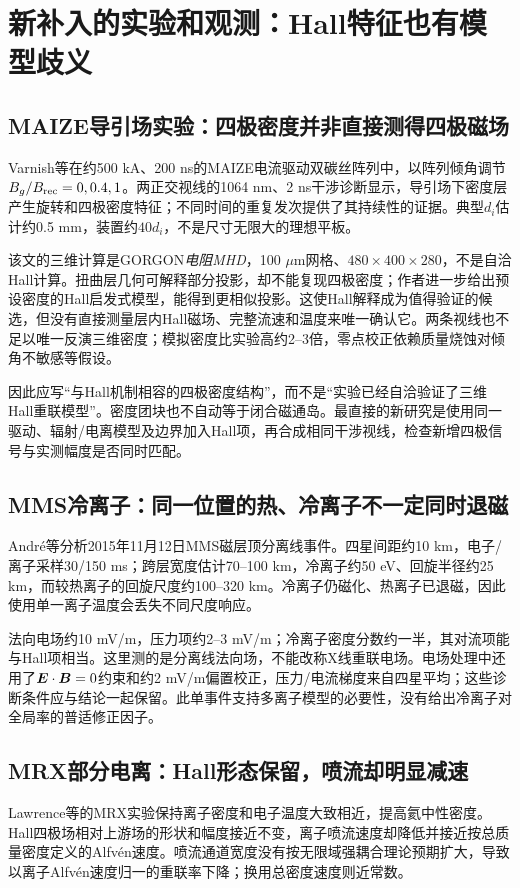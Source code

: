 \section{新补入的实验和观测：Hall特征也有模型歧义}
\subsection{MAIZE导引场实验：四极密度并非直接测得四极磁场}
Varnish等\citep{F703}在约500 kA、200 ns的MAIZE电流驱动双碳丝阵列中，以阵列倾角调节$B_g/B_{\rm rec}=0,0.4,1$。两正交视线的1064 nm、2 ns干涉诊断显示，导引场下密度层产生旋转和四极密度特征；不同时间的重复发次提供了其持续性的证据。典型$d_i$估计约0.5 mm，装置约$40d_i$，不是尺寸无限大的理想平板。

该文的三维计算是GORGON\emph{电阻MHD}，100 $\mu$m网格、$480\times400\times280$，不是自洽Hall计算。扭曲层几何可解释部分投影，却不能复现四极密度；作者进一步给出预设密度的Hall启发式模型，能得到更相似投影。这使Hall解释成为值得验证的候选，但没有直接测量层内Hall磁场、完整流速和温度来唯一确认它。两条视线也不足以唯一反演三维密度；模拟密度比实验高约2--3倍，零点校正依赖质量烧蚀对倾角不敏感等假设。

因此应写“与Hall机制相容的四极密度结构”，而不是“实验已经自洽验证了三维Hall重联模型”。密度团块也不自动等于闭合磁通岛。最直接的新研究是使用同一驱动、辐射/电离模型及边界加入Hall项，再合成相同干涉视线，检查新增四极信号与实测幅度是否同时匹配。

\subsection{MMS冷离子：同一位置的热、冷离子不一定同时退磁}
André等\citep{L227}分析2015年11月12日MMS磁层顶分离线事件。四星间距约10 km，电子/离子采样30/150 ms；跨层宽度估计70--100 km，冷离子约50 eV、回旋半径约25 km，而较热离子的回旋尺度约100--320 km。冷离子仍磁化、热离子已退磁，因此使用单一离子温度会丢失不同尺度响应。

法向电场约10 mV/m，压力项约2--3 mV/m；冷离子密度分数约一半，其对流项能与Hall项相当。这里测的是分离线法向场，不能改称X线重联电场。电场处理中还用了$\bm{E}\cdot\bm{B}=0$约束和约2 mV/m偏置校正，压力/电流梯度来自四星平均；这些诊断条件应与结论一起保留。此单事件支持多离子模型的必要性，没有给出冷离子对全局率的普适修正因子。

\subsection{MRX部分电离：Hall形态保留，喷流却明显减速}
Lawrence等的MRX实验\citep{L190}保持离子密度和电子温度大致相近，提高氦中性密度。Hall四极场相对上游场的形状和幅度接近不变，离子喷流速度却降低并接近按总质量密度定义的Alfvén速度。喷流通道宽度没有按无限域强耦合理论预期扩大，导致以离子Alfvén速度归一的重联率下降；换用总密度速度则近常数。

